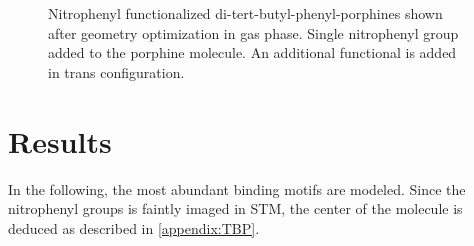 \begin{figure}[h!]\centering
	\caption{Nitrophenyl functionalized di-tert-butyl-phenyl-porphines shown after geometry optimization in gas phase.  Single nitrophenyl group added to the porphine molecule.  An additional functional is added in %
	trans configuration.}
	\label{fig:TBP}
\end{figure}	


\newpage
\section{Results}
In the following, the most abundant binding motifs are modeled. Since the nitrophenyl groups is faintly imaged in STM, the center of the molecule is deduced as described in \autoref{appendix:TBP}.
